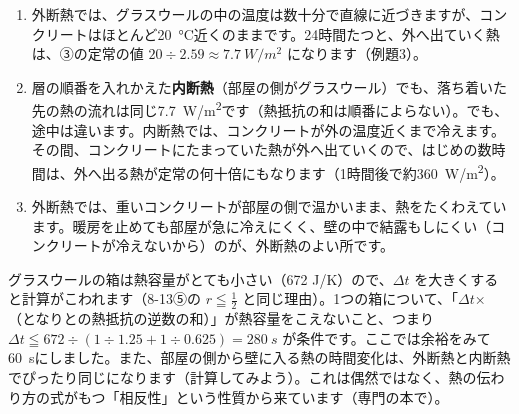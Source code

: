 \begin{bkcenter}
\label{ph:熱-11:tab-sheet}
\end{bkcenter}

\begin{enumerate}[label={\bkcircled{\arabic*}}, leftmargin=2.4\zw, itemsep=1pt, topsep=2pt]
\item 外断熱では、グラスウールの中の温度は数十分で直線に近づきますが、コンクリートはほとんど\qty{20}{\celsius}近くのままです。24時間たつと、外へ出ていく熱は、③の定常の値 $20\div2.59\approx\qty{7.7}{W/m^2}$ になります（例題3）。
\item 層の順番を入れかえた\textbf{内断熱}（部屋の側がグラスウール）でも、落ち着いた先の熱の流れは同じ\qty{7.7}{W/m^2}です（熱抵抗の和は順番によらない）。でも、途中は違います。内断熱では、コンクリートが外の温度近くまで冷えます。その間、コンクリートにたまっていた熱が外へ出ていくので、はじめの数時間は、外へ出る熱が定常の何十倍にもなります（1時間後で約\qty{360}{W/m^2}）。
\item 外断熱では、重いコンクリートが部屋の側で温かいまま、熱をたくわえています。暖房を止めても部屋が急に冷えにくく、壁の中で結露もしにくい（コンクリートが冷えないから）のが、外断熱のよい所です。
\end{enumerate}

\begin{seikaku}
グラスウールの箱は熱容量がとても小さい（672 J/K）ので、$\Delta t$ を大きくすると計算がこわれます（8-13⑤の $r\leqq\tfrac12$ と同じ理由）。1つの箱について、「$\Delta t$×（となりとの熱抵抗の逆数の和）」が熱容量をこえないこと、つまり $\Delta t\leqq672\div(1\div1.25+1\div0.625)=\qty{280}{s}$ が条件です。ここでは余裕をみて\qty{60}{s}にしました。また、部屋の側から壁に入る熱の時間変化は、外断熱と内断熱でぴったり同じになります（計算してみよう）。これは偶然ではなく、熱の伝わり方の式がもつ「相反性」という性質から来ています（専門の本で）。
\end{seikaku}

